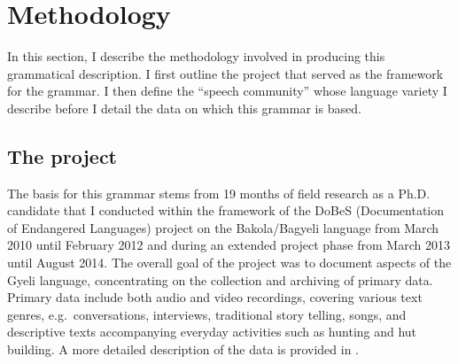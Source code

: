 




\section{Methodology}
\label{sec:Methodology}

In this section, I describe the methodology involved in producing this grammatical description. I first outline the project that served as the framework for the grammar. I then define the ``speech community'' whose language variety I describe before I detail the data on which this grammar is based. 

\subsection{The project}
\label{sec:Dobes}

The basis for this grammar stems from 19 months of field research as a Ph.D. candidate that I conducted within the framework of the DoBeS (Documentation of Endangered Languages) project on the Bakola/Bagyeli language from March 2010 until February 2012 and during an extended project phase from March 2013 until August 2014. 
The overall goal of the project was to document aspects of the Gyeli language, concentrating on the collection and archiving of primary data. Primary data include both audio and video recordings, covering various text genres, e.g.\ conversations, interviews, traditional story telling, songs, and descriptive texts accompanying everyday activities such as hunting and hut building. A more detailed description of the data is provided in . 

